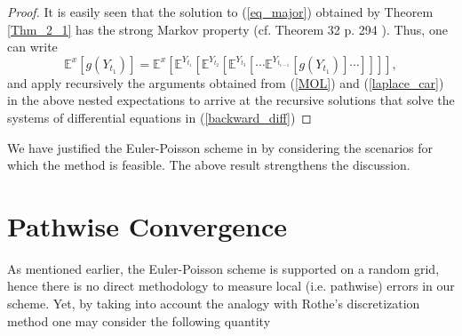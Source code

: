 \begin{proof}
It is easily seen that the solution to (\ref{eq_major}) obtained by Theorem \ref{Thm_2_1} has the strong Markov
property (cf. Theorem 32 p. 294 \cite{protter2005stochastic}). Thus, one can write
\begin{equation*}
    \mathbb{E}^x[g (Y_{t_1})] = \mathbb{E}^x[\mathbb{E}^{Y_{t_1}} [\mathbb{E}^{Y_{t_2}} [\mathbb{E}^{Y_{t_3}} [ \cdots \mathbb{E}^{Y_{t_{i-1}}}[g (Y_{t_1})] \cdots]]]],
\end{equation*}
and apply recursively the arguments obtained from (\ref{MOL}) and (\ref{laplace_car}) in the above nested expectations to arrive at the recursive solutions that solve the systems of differential equations in (\ref{backward_diff})
\end{proof}
We have justified the Euler-Poisson scheme in  by considering the scenarios for which the method is feasible. The above result strengthens the discussion.

\section{Pathwise Convergence}
As mentioned earlier, the Euler-Poisson scheme is supported on a random grid, hence there is no direct  methodology to measure local (i.e. pathwise) errors in our scheme. Yet, by taking into account the analogy with Rothe's discretization method one may  consider the following quantity

